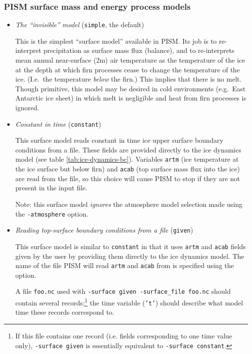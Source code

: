\subsubsection{PISM surface mass and energy process models}
\label{sec:pism-surface-snow}

\begin{itemize}
  \item \emph{The ``invisible'' model} (\texttt{simple}, the default)

    This is the simplest ``surface model'' available in PISM.  Its job is to re-interpret  precipitation as surface mass flux (balance), and to re-interprets mean annual near-surface (2m) air temperature as the temperature of the ice at the depth at which firn processes cease to change the temperature of the ice.  (I.e.~the temperature \emph{below} the firn.)  This implies that there is no melt.  Though primitive, this model may be desired in cold environments (e.g.~East Antarctic ice sheet) in which melt is negligible and heat from firn processes is ignored.

  \item \emph{Constant in time} (\texttt{constant})

    This surface model reads constant in time ice upper surface boundary conditions from a file.  These fields are provided directly to the ice dynamics model (see table \ref{tab:ice-dynamics-bc}).  Variables \texttt{artm} (ice temperature at the ice surface but below firn) and \texttt{acab} (top surface mass flux into the ice) are read from the file, so this choice will cause PISM to stop if they are not present in the input file.

    Note: this surface model \emph{ignores} the atmosphere model selection made using the \texttt{-atmosphere} option.

  \item \emph{Reading top-surface boundary conditions from a file} (\texttt{given})

    This surface model is similar to \texttt{constant} in that it uses \texttt{artm} and \texttt{acab} fields given by the user by providing them directly to the ice dynamics model. The name of the file PISM will read \texttt{artm} and \texttt{acab} from is specified using the  option.

    A file \texttt{foo.nc} used with \texttt{-surface given -surface_file foo.nc} should contain several records;\footnote{If this file contains one record (i.e. fields corresponding to one time value only), \texttt{-surface given} is essentially equivalent to \texttt{-surface constant}.} the time variable (\texttt{'t'}) should describe what model time these records correspond to.


\end{itemize}
